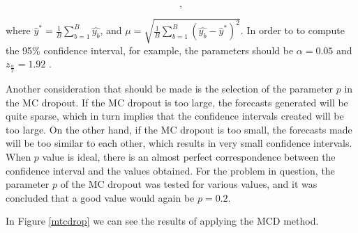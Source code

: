 \begin{equation}
    [\hat{y}^* - z_{\frac{\alpha}{2}}\mu,\ \hat{y}^* + z_{\frac{\alpha}{2}}\mu], 
\end{equation}

where $\hat{y}^* = \frac{1}{B}\sum_{b=1}^B\hat{y_b}$, and $\mu = \sqrt{\frac{1}{B}\sum_{b=1}^B(\hat{y_b} -\hat{y}^*)^2}$. In order to to compute the 95\% confidence interval, for example, the parameters should be $\alpha=0.05$ and $z_{\frac{\alpha}{2}}= 1.92$ . 

Another consideration that should be made is the selection of the parameter $p$ in the MC dropout. If the MC dropout is too large, the forecasts generated will be quite sparse, which in turn implies that the confidence intervals created will be too large. On the other hand, if the MC dropout is too small, the forecasts made will be too similar to each other, which results in very small confidence intervals. When $p$ value is ideal, there is an almost perfect correspondence between the confidence interval and the values obtained. For the problem in question, the parameter $p$ of the MC dropout was tested for various values, and it was concluded that a good value would again be $p = 0.2$.

In Figure \ref{mtcdrop} we can see the results of applying the \ac{MCD} method.


